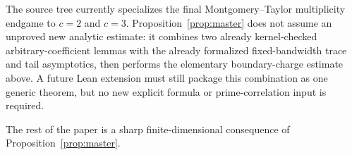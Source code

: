 \begin{remark}\label{rem:reuse}
The source tree currently specializes the final Montgomery--Taylor multiplicity endgame to $c=2$ and $c=3$.  Proposition~\ref{prop:master} does not assume an unproved new analytic estimate: it combines two already kernel-checked arbitrary-coefficient lemmas with the already formalized fixed-bandwidth trace and tail asymptotics, then performs the elementary boundary-charge estimate above.  A future Lean extension must still package this combination as one generic theorem, but no new explicit formula or prime-correlation input is required.
\end{remark}

The rest of the paper is a sharp finite-dimensional consequence of Proposition~\ref{prop:master}.
